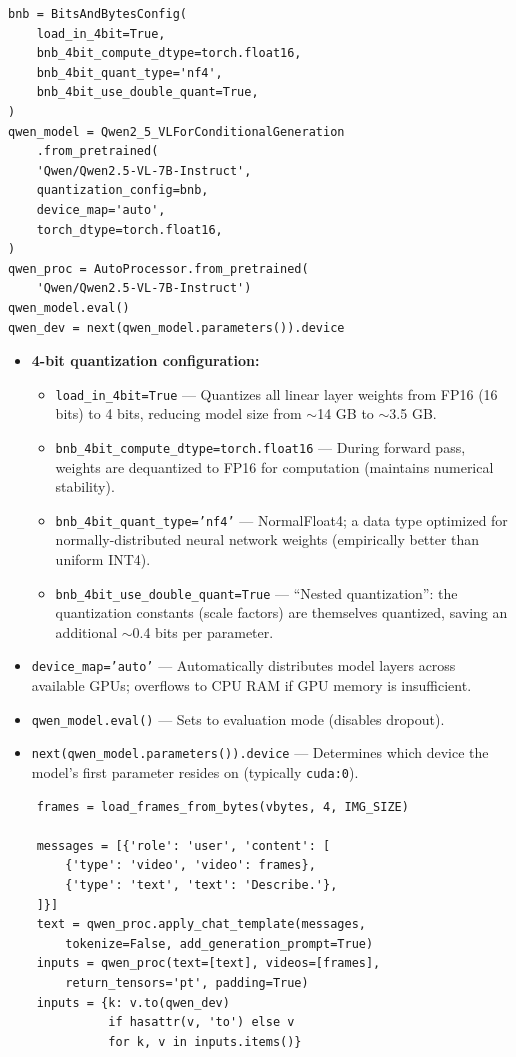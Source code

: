 \begin{lstlisting}
bnb = BitsAndBytesConfig(
    load_in_4bit=True,
    bnb_4bit_compute_dtype=torch.float16,
    bnb_4bit_quant_type='nf4',
    bnb_4bit_use_double_quant=True,
)
qwen_model = Qwen2_5_VLForConditionalGeneration
    .from_pretrained(
    'Qwen/Qwen2.5-VL-7B-Instruct',
    quantization_config=bnb,
    device_map='auto',
    torch_dtype=torch.float16,
)
qwen_proc = AutoProcessor.from_pretrained(
    'Qwen/Qwen2.5-VL-7B-Instruct')
qwen_model.eval()
qwen_dev = next(qwen_model.parameters()).device
\end{lstlisting}

\begin{explanation}
\begin{itemize}[nosep]
  \item \textbf{4-bit quantization configuration:}
  \begin{itemize}[nosep]
    \item \texttt{load\_in\_4bit=True} --- Quantizes all linear layer weights from FP16 (16 bits) to 4 bits, reducing model size from $\sim$14 GB to $\sim$3.5 GB.
    \item \texttt{bnb\_4bit\_compute\_dtype=torch.float16} --- During forward pass, weights are dequantized to FP16 for computation (maintains numerical stability).
    \item \texttt{bnb\_4bit\_quant\_type='nf4'} --- NormalFloat4; a data type optimized for normally-distributed neural network weights (empirically better than uniform INT4).
    \item \texttt{bnb\_4bit\_use\_double\_quant=True} --- ``Nested quantization'': the quantization constants (scale factors) are themselves quantized, saving an additional $\sim$0.4 bits per parameter.
  \end{itemize}
  \item \texttt{device\_map='auto'} --- Automatically distributes model layers across available GPUs; overflows to CPU RAM if GPU memory is insufficient.
  \item \texttt{qwen\_model.eval()} --- Sets to evaluation mode (disables dropout).
  \item \texttt{next(qwen\_model.parameters()).device} --- Determines which device the model's first parameter resides on (typically \texttt{cuda:0}).
\end{itemize}
\end{explanation}

\begin{lstlisting}
    frames = load_frames_from_bytes(vbytes, 4, IMG_SIZE)

    messages = [{'role': 'user', 'content': [
        {'type': 'video', 'video': frames},
        {'type': 'text', 'text': 'Describe.'},
    ]}]
    text = qwen_proc.apply_chat_template(messages,
        tokenize=False, add_generation_prompt=True)
    inputs = qwen_proc(text=[text], videos=[frames],
        return_tensors='pt', padding=True)
    inputs = {k: v.to(qwen_dev)
              if hasattr(v, 'to') else v
              for k, v in inputs.items()}
\end{lstlisting}

